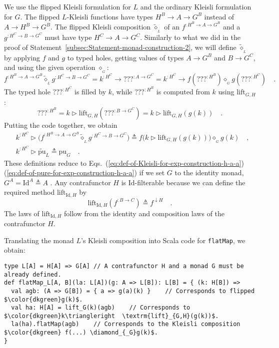 We use the flipped Kleisli formulation for $L$ and the ordinary Kleisli
formulation for $G$. The flipped $L$-Kleisli functions have types
$H^{B}\rightarrow A\rightarrow G^{B}$ instead of $A\rightarrow H^{B}\rightarrow G^{B}$.
The flipped Kleisli composition $\tilde{\diamond}_{_{L}}$ of an $f^{:H^{B}\rightarrow A\rightarrow G^{B}}$
and a $g^{:H^{C}\rightarrow B\rightarrow G^{C}}$ must have type $H^{C}\rightarrow A\rightarrow G^{C}$.
Similarly to what we did in the proof of Statement~\ref{subsec:Statement-monad-construction-2},
we will define $\tilde{\diamond}_{_{L}}$ by applying $f$ and $g$
to typed holes, getting values of types $A\rightarrow G^{B}$ and
$B\rightarrow G^{C}$, and using the given operation $\diamond_{_{G}}$:
\[
f^{:H^{B}\rightarrow A\rightarrow G^{B}}\tilde{\diamond}_{_{L}}g^{:H^{C}\rightarrow B\rightarrow G^{C}}=k^{:H^{C}}\rightarrow\text{???}^{:A\rightarrow G^{C}}=k^{:H^{C}}\rightarrow f(\text{???}^{:H^{B}})\diamond_{_{G}}g(\text{???}^{:H^{C}})\quad.
\]
The typed hole $\text{???}^{:H^{C}}$ is filled by $k$, while $\text{???}^{:H^{B}}$
is computed from $k$ using $\text{lift}_{G,H}$:
\[
\text{???}^{:H^{B}}=k\triangleright\text{lift}_{G,H}(\text{???}^{:B\rightarrow G^{C}})=k\triangleright\text{lift}_{G,H}(g(k))\quad.
\]
Putting the code together, we obtain
\begin{align*}
 & k^{:H^{C}}\triangleright\big(f^{:H^{B}\rightarrow A\rightarrow G^{B}}\tilde{\diamond}_{_{L}}g^{:H^{C}\rightarrow B\rightarrow G^{C}}\big)\triangleq f\big(k\triangleright\text{lift}_{G,H}(g(k))\big)\diamond_{_{G}}g(k)\quad,\\
 & k^{:H^{C}}\triangleright\tilde{\text{pu}}_{L}\triangleq\text{pu}_{G}\quad.
\end{align*}
These definitions reduce to Eqs.~(\ref{eq:def-of-Kleisli-for-exp-construction-h-a-a})\textendash (\ref{eq:def-of-pure-for-exp-construction-h-a-a})
if we set $G$ to the identity monad, $G^{A}=\text{Id}^{A}\triangleq A$
. Any contrafunctor $H$ is $\text{Id}$-filterable because we can
define the required method $\text{lift}_{\text{Id},H}$ by
\[
\text{lift}_{\text{Id},H}(f^{:B\rightarrow C})\triangleq f^{\downarrow H}\quad.
\]
The laws of $\text{lift}_{\text{Id},H}$ follow from the identity
and composition laws of the contrafunctor $H$.

Translating the monad $L$\textsf{'}s Kleisli composition into Scala code for
\lstinline!flatMap!, we obtain:
\begin{lstlisting}[mathescape=true]
type L[A] = H[A] => G[A] // A contrafunctor H and a monad G must be already defined.
def flatMap_L[A, B](la: L[A])(g: A => L[B]): L[B] = { (k: H[B]) =>
  val agb: (A => G[B]) = { a => g(a)(k) }    // Corresponds to flipped $\color{dkgreen}g(k)$.
  val ha: H[A] = lift_G(k)(agb)    // Corresponds to $\color{dkgreen}k\triangleright  \textrm{lift}_{G,H}(g(k))$.
  la(ha).flatMap(agb)    // Corresponds to the Kleisli composition $\color{dkgreen} f(...) \diamond_{_G}g(k)$.
}
\end{lstlisting}

